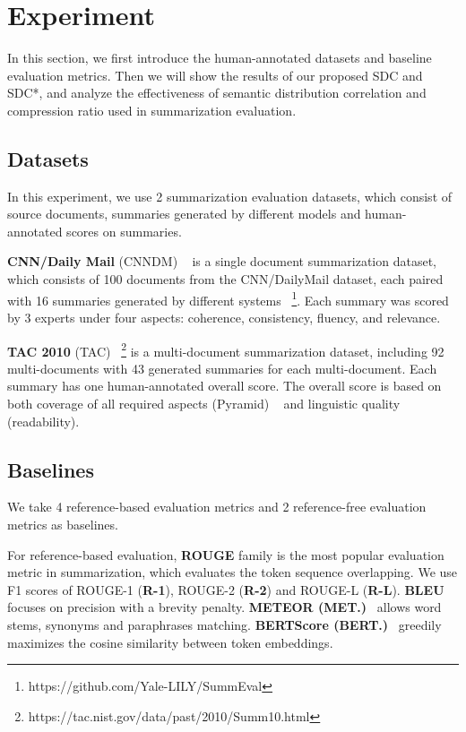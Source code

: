 \section{Experiment}
In this section, we first introduce the human-annotated datasets and baseline evaluation metrics.
Then we will show the results of our proposed SDC and SDC*,
and analyze the effectiveness of semantic distribution correlation and compression ratio used in summarization evaluation.

\subsection{Datasets}
In this experiment, we use 2 summarization evaluation datasets, which consist of source documents, summaries generated by different models and human-annotated scores on summaries.

\textbf{CNN/Daily Mail} (CNNDM)
~\cite{summeval} is a single document summarization dataset, which consists of 100 documents from the CNN/DailyMail dataset, each paired with 16 summaries generated by different systems
~\footnote{https://github.com/Yale-LILY/SummEval}.
Each summary was scored by 3
experts under four aspects: 
coherence, consistency,
fluency, and relevance.

\textbf{TAC 2010} (TAC)
~\footnote{https://tac.nist.gov/data/past/2010/Summ10.html} is a multi-document summarization dataset,
including 92 multi-documents with 43 generated summaries for each multi-document.
Each summary has one human-annotated overall score. The overall score is based on both coverage of all required aspects (Pyramid) ~\cite{pyramid} and linguistic quality (readability).

\subsection{Baselines}
\label{sec:baseline}
We take 4 reference-based evaluation metrics
and 2 reference-free evaluation metrics as baselines.

For reference-based evaluation, 
\textbf{ROUGE} family is the most popular evaluation metric in summarization, 
which evaluates the token sequence overlapping.
We use F1 scores of  ROUGE-1 ({\bf R-1}), ROUGE-2 ({\bf R-2}) and ROUGE-L ({\bf R-L}).
\textbf{BLEU}~\cite{bleu2002} focuses on precision with a brevity penalty. 
\textbf{METEOR (MET.)}~\cite{meteor2005}  allows word stems, synonyms and paraphrases matching.
\textbf{BERTScore (BERT.)}~\cite{bertscore} greedily 
maximizes the cosine similarity between token embeddings.

